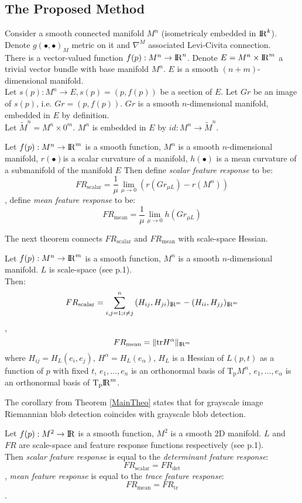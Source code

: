 \documentclass{llncs}
\newcommand{\toreal}{\rightarrow\bbbr}
\newcommand{\toeuclidean}[1]{\rightarrow\bbbr^{#1}}
\newcommand{\CovariantDiffManif}[1]{\nabla^{#1}}
\newcommand{\TangentSpaceP}[1]{\mathrm{T_p}{#1}}
\newcommand{\FRScalar}{FR_{\mathrm{scalar}}}
\newcommand{\FRMean}{FR_{\mathrm{mean}}}
\newcommand {\tr}{\mathrm{tr}}
\begin{document}
\subsection{The Proposed Method}
Consider a smooth connected manifold $M^n$ (isometricaly embedded in ${\rm I\!R}^k$). Denote $g(∙,∙)_{M}$ metric on it and $\CovariantDiffManif{M}$ associated Levi-Civita connection. 
\\
There is a vector-valued function $f(p):M^n\toeuclidean{n}$. Denote $E=M^n\times {\rm I\!R}^m$ a  trivial vector bundle with base manifold $M^n$. $E$ is a smooth $(n+m)$-dimensional manifold. 
\\
Let $s(p):M^n\rightarrow E,s(p)=(p,f(p))$ be a section of $E$. Let $Gr$ be an image of $s(p)$, i.e. $Gr=(p,f(p))$. $Gr$ is a smooth $n$-dimensional manifold, embedded in $E$ by definition.
\\
Let $\tilde{M}^n=M^n\times 0^m$. $M^n$ is embedded in $E$ by $id:M^n\rightarrow\tilde{M}^n$.
\\
\begin{definition} \label{RiemanDef}
Let $f(p):M^n\toeuclidean{m}$ is a smooth function, $M^n$ is a smooth $n$-dimensional manifold, $r(∙)$is a scalar curvature of a manifold, $h(∙)$ is a mean curvature of a submanifold of the manifold $E$
Then define \emph{scalar feature response} to be:
$$\FRScalar=\frac{1}{\mu}\lim_{\mu\to 0} ( r(Gr_{\mu L} )-r(M^n ))$$,
define \emph{mean feature response} to be:
$$\FRMean=\frac{1}{\mu}\lim_{\mu\to 0} h(Gr_{\mu L})$$
\end{definition}
The next theorem connects $\FRScalar$ and $\FRMean$ with scale-space Hessian.
\begin{theorem} \label{MainTheo}
Let $f(p):M^n\toeuclidean{m}$ is a smooth function, $M^n$ is a smooth $n$-dimensional manifold. $L$ is scale-space (see p.1).\\
Then:
$$\FRScalar=\sum_{i,j=1; i\ne j}^{n}{(H_{ij},H_{ji})_{\bbbr^m}-(H_{ii},H_{jj})_{\bbbr^m}}$$,
$$\FRMean=\|\tr H^\alpha\|_{\bbbr^m}$$
where $H_{ij}=H_L (e_i,e_j)$, $H^\alpha=H_L (e_\alpha)$, $H_L$ is a Hessian of $L(p,t)$ as a function of $p$ with fixed $t$, 
$e_1,\dots,e_n$ is an orthonormal basis of $\TangentSpaceP{M^n}$, $e_1,\dots,e_\alpha$ is an orthonormal basis of $\TangentSpaceP{\bbbr^m}$.
\end{theorem}
The corollary from Theorem \ref{MainTheo} states that for grayscale image Riemannian blob detection coincides with grayscale blob detection.
\begin{corollary}\label{GrayscaleCol}
Let $f(p):M^2\toreal$ is a smooth function, $M^2$ is a smooth 2D manifold. $L$ and $FR$ are scale-space and feature response functions respectively (see p.1).\\
Then \emph{scalar feature response} is equal to the \emph{determinant feature response}:
$$\FRScalar=FR_{\det}$$,
\emph{mean feature response} is equal to the \emph{trace feature response}:
$$\FRMean=FR_{\mathrm{tr}}$$.
\end{corollary}
\end{document}
